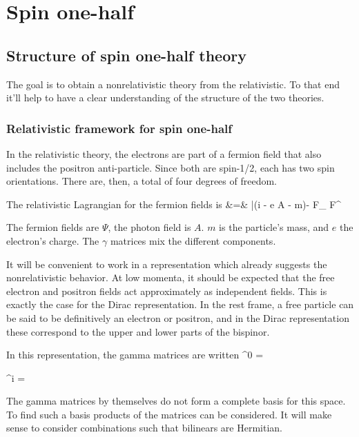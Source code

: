 \chapter{Spin one-half}

\section{Structure of spin one-half theory}

The goal is to obtain a nonrelativistic theory from the relativistic.  To that end it'll help to have a clear understanding of the structure of the two theories.

\subsection{Relativistic framework for spin one-half}
In the relativistic theory, the electrons are part of a fermion field that also includes the positron anti-particle.  Since both are spin-1/2, each has two spin orientations.  There are, then, a total of four degrees of freedom. 

The relativistic Lagrangian for the fermion fields is
\beqa
{} &=&	
	\bar{\Psi}(i \partial \cdot \gamma - e A \cdot \gamma - m)\Psi  -  F_{\mu\nu} F^{\mu\nu}
\eeqa

The fermion fields are $\Psi$, the photon field is $A$.   $m$ is the particle's mass, and $e$ the electron's charge.  The $\gamma$ matrices mix the different components.  %

It will be convenient to work in a representation which already suggests the nonrelativistic behavior.  At low momenta, it should be expected that the free electron and positron fields act approximately as independent fields.  This is exactly the case for the Dirac representation.   In the rest frame, a free particle can be said to be definitively an electron or positron, and in the Dirac representation these correspond to the upper and lower parts of the bispinor.  

In this representation, the gamma matrices are written
\beq
	\gamma^0 = 
\eeq

\beq
	\gamma^i = 
\eeq	




The gamma matrices by themselves do not form a complete basis for this space.  To find such a basis products of the matrices can be considered.  It will make sense to consider combinations such that bilinears are Hermitian.  
 

